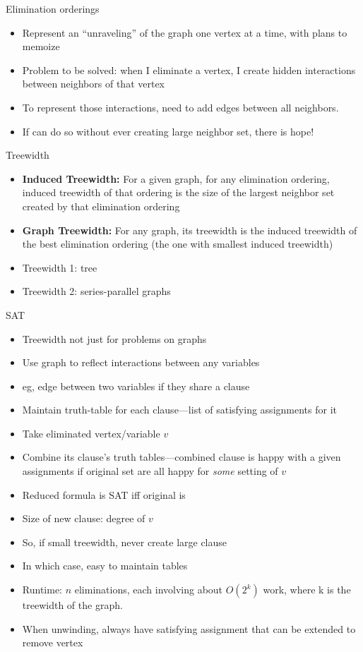 \documentclass{article}
\begin{document}
Elimination orderings
\begin{itemize}
\item Represent an ``unraveling'' of the graph one vertex at a time,
  with plans to memoize
\item Problem to be solved: when I eliminate a vertex, I create hidden
  interactions between neighbors of that vertex
\item To represent those interactions, need to add edges between all
  neighbors.
\item If can do so without ever creating large neighbor set, there is
  hope!
\end{itemize}

Treewidth
\begin{itemize}
\item \textbf{ Induced Treewidth:} For a given graph, for any elimination ordering, induced treewidth of that ordering is the size of the largest neighbor set created by
  that elimination ordering
\item \textbf{ Graph Treewidth:} For any graph, its treewidth is the induced treewidth of the best elimination ordering (the one with smallest induced treewidth)
\item Treewidth 1: tree
\item Treewidth 2: series-parallel graphs
\end{itemize}

SAT
\begin{itemize}
\item Treewidth not just for problems on graphs
\item Use graph to reflect interactions between any variables
\item eg, edge between two variables if they share a clause
\item Maintain truth-table for each clause---list of satisfying
  assignments for it
\item Take eliminated vertex/variable $v$
\item Combine its clause's truth tables---combined clause is happy
  with a given assignments if original set are all happy for
  \emph{some} setting of $v$
\item Reduced formula is SAT iff original is
\item Size of new clause: degree of $v$
\item So, if small treewidth, never create large clause
\item In which case, easy to maintain tables
\item Runtime: $n$ eliminations, each involving about $O(2^k)$ work, where k is the treewidth of the graph.
\item When unwinding, always have satisfying assignment that can be
  extended to remove vertex
\end{itemize}
\end{document}
